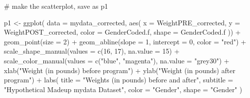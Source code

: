 \documentclass[
  letterpaper,
  DIV=11,
  numbers=noendperiod]{scrartcl}
\newenvironment{Shaded}{\begin{snugshade}}{\end{snugshade}}
\newcommand{\AttributeTok}[1]{\textcolor[rgb]{0.40,0.45,0.13}{#1}}
\newcommand{\CommentTok}[1]{\textcolor[rgb]{0.37,0.37,0.37}{#1}}
\newcommand{\DecValTok}[1]{\textcolor[rgb]{0.68,0.00,0.00}{#1}}
\newcommand{\FunctionTok}[1]{\textcolor[rgb]{0.28,0.35,0.67}{#1}}
\newcommand{\NormalTok}[1]{\textcolor[rgb]{0.00,0.23,0.31}{#1}}
\newcommand{\OtherTok}[1]{\textcolor[rgb]{0.00,0.23,0.31}{#1}}
\newcommand{\SpecialCharTok}[1]{\textcolor[rgb]{0.37,0.37,0.37}{#1}}
\newcommand{\StringTok}[1]{\textcolor[rgb]{0.13,0.47,0.30}{#1}}
\begin{document}
\begin{Shaded}
\begin{Highlighting}[]
\CommentTok{\# make the scatterplot, save as p1}

\NormalTok{p1 }\OtherTok{\textless{}{-}} \FunctionTok{ggplot}\NormalTok{(}
  \AttributeTok{data =}\NormalTok{ mydata\_corrected,}
  \FunctionTok{aes}\NormalTok{(}
    \AttributeTok{x =}\NormalTok{ WeightPRE\_corrected,}
    \AttributeTok{y =}\NormalTok{ WeightPOST\_corrected,}
    \AttributeTok{color =}\NormalTok{ GenderCoded.f,}
    \AttributeTok{shape =}\NormalTok{ GenderCoded.f}
\NormalTok{  )) }\SpecialCharTok{+}
  \FunctionTok{geom\_point}\NormalTok{(}\AttributeTok{size =} \DecValTok{2}\NormalTok{) }\SpecialCharTok{+}
  \FunctionTok{geom\_abline}\NormalTok{(}\AttributeTok{slope =} \DecValTok{1}\NormalTok{,}
              \AttributeTok{intercept =} \DecValTok{0}\NormalTok{,}
              \AttributeTok{color =} \StringTok{"red"}\NormalTok{) }\SpecialCharTok{+}
  \FunctionTok{scale\_shape\_manual}\NormalTok{(}\AttributeTok{values =} \FunctionTok{c}\NormalTok{(}\DecValTok{16}\NormalTok{, }\DecValTok{17}\NormalTok{), }\AttributeTok{na.value =} \DecValTok{15}\NormalTok{) }\SpecialCharTok{+}
  \FunctionTok{scale\_color\_manual}\NormalTok{(}\AttributeTok{values =} \FunctionTok{c}\NormalTok{(}\StringTok{"blue"}\NormalTok{, }\StringTok{"magenta"}\NormalTok{),}
                     \AttributeTok{na.value =} \StringTok{"grey30"}\NormalTok{) }\SpecialCharTok{+}
  \FunctionTok{xlab}\NormalTok{(}\StringTok{"Weight (in pounds) before program"}\NormalTok{) }\SpecialCharTok{+}
  \FunctionTok{ylab}\NormalTok{(}\StringTok{"Weight (in pounds) after program"}\NormalTok{) }\SpecialCharTok{+}
  \FunctionTok{labs}\NormalTok{(}
    \AttributeTok{title =} \StringTok{"Weights (in pounds) before and after"}\NormalTok{,}
    \AttributeTok{subtitle =} \StringTok{"Hypothetical Madeup mydata Dataset"}\NormalTok{,}
    \AttributeTok{color =} \StringTok{"Gender"}\NormalTok{,}
    \AttributeTok{shape =} \StringTok{"Gender"}
\NormalTok{  )}
\end{Highlighting}
\end{Shaded}
\end{document}

